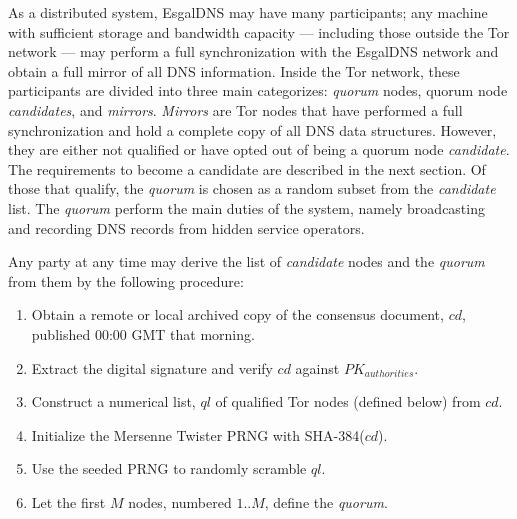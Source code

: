 As a distributed system, EsgalDNS may have many participants; any machine with sufficient storage and bandwidth capacity --- including those outside the Tor network --- may perform a full synchronization with the EsgalDNS network and obtain a full mirror of all DNS information. Inside the Tor network, these participants are divided into three main categorizes: \textit{quorum} nodes, quorum node \textit{candidates}, and \textit{mirrors}. \textit{Mirrors} are Tor nodes that have performed a full synchronization and hold a complete copy of all DNS data structures. However, they are either not qualified or have opted out of being a quorum node \textit{candidate}. The requirements to become a candidate are described in the next section. Of those that qualify, the \textit{quorum} is chosen as a random subset from the \textit{candidate} list. The \textit{quorum} perform the main duties of the system, namely broadcasting and recording DNS records from hidden service operators. 

Any party at any time may derive the list of \textit{candidate} nodes and the \textit{quorum} from them by the following procedure:

\begin{enumerate}
	\item Obtain a remote or local archived copy of the consensus document, $ cd $, published 00:00 GMT that morning.
	\item Extract the digital signature and verify $ cd $ against $ PK_{authorities} $.
	\item Construct a numerical list, $ ql $ of qualified Tor nodes (defined below) from $ cd $.
	\item Initialize the Mersenne Twister PRNG with SHA-384($ cd $).
	\item Use the seeded PRNG to randomly scramble $ ql $.
	\item Let the first $ M $ nodes, numbered $ 1 .. M $, define the \textit{quorum}.
\end{enumerate}


